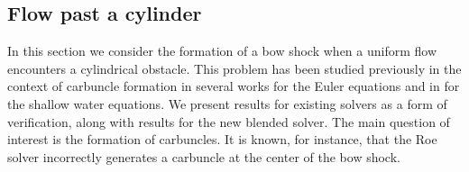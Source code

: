 \documentclass[preprint, 11pt]{article}
\begin{document}


\subsection{Flow past a cylinder}\label{sec:bow_shock}
In this section we consider the formation of a bow shock when a
uniform flow encounters a cylindrical obstacle.  This problem has
been studied previously in the context of carbuncle formation in
several works for the Euler equations and in
\cite{kemm2014note,bader2014carbuncle} for the shallow water equations.
We present results for existing solvers as a form of verification,
along with results for the new blended solver.  The main question of
interest is the formation of carbuncles.  It is known, for instance,
that the Roe solver incorrectly generates a carbuncle at the center
of the bow shock.
\end{document}
